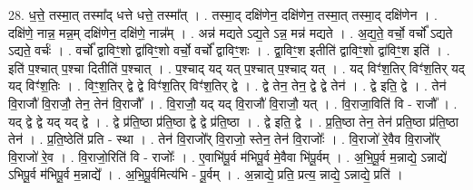 \documentclass[17pt]{extarticle}
\begin{document}
28. ध॒त्ते॒ तस्मा॒त् तस्मा᳚द् धत्ते धत्ते॒ तस्मा᳚त् । . तस्मा॒द् दक्षि॑णेन॒ दक्षि॑णेन॒ तस्मा॒त् तस्मा॒द् दक्षि॑णेन । . दक्षि॑णे॒ नान्न॒ मन्न॒म् दक्षि॑णेन॒ दक्षि॑णे॒ नान्न᳚म् । . अन्न॑ मद्यते ऽद्य॒ते ऽन्न॒ मन्न॑ मद्यते । . अ॒द्य॒ते॒ वर्चो॒ वर्चो᳚ ऽद्यते ऽद्यते॒ वर्चः॑ । . वर्चो᳚ द्वाविꣳ॒॒शो द्वा॑विꣳ॒॒शो वर्चो॒ वर्चो᳚ द्वाविꣳ॒॒शः । . द्वा॒विꣳ॒॒श इतीति॑ द्वाविꣳ॒॒शो द्वा॑विꣳ॒॒श इति॑ । . इति॑ प॒श्चात् प॒श्चा दितीति॑ प॒श्चात् । . प॒श्चाद् यद् यत् प॒श्चात् प॒श्चाद् यत् । . यद् विꣳ॑श॒तिर् विꣳ॑श॒तिर् यद् यद् विꣳ॑श॒तिः । . विꣳ॒॒श॒तिर् द्वे द्वे विꣳ॑श॒तिर् विꣳ॑श॒तिर् द्वे । . द्वे तेन॒ तेन॒ द्वे द्वे तेन॑ । . द्वे इति॒ द्वे । . तेन॑ वि॒राजौ॑ वि॒राजौ॒ तेन॒ तेन॑ वि॒राजौ᳚ । . वि॒राजौ॒ यद् यद् वि॒राजौ॑ वि॒राजौ॒ यत् । . वि॒राजा॒विति॑ वि - राजौ᳚ । . यद् द्वे द्वे यद् यद् द्वे । . द्वे प्र॑ति॒ष्ठा प्र॑ति॒ष्ठा द्वे द्वे प्र॑ति॒ष्ठा । . द्वे इति॒ द्वे । . प्र॒ति॒ष्ठा तेन॒ तेन॑ प्रति॒ष्ठा प्र॑ति॒ष्ठा तेन॑ । . प्र॒ति॒ष्ठेति॑ प्रति - स्था । . तेन॑ वि॒राजो᳚र् वि॒राजो॒ स्तेन॒ तेन॑ वि॒राजोः᳚ । . वि॒राजो॑ रे॒वैव वि॒राजो᳚र् वि॒राजो॑ रे॒व । . वि॒राजो॒रिति॑ वि - राजोः᳚ । . ए॒वाभि॑पू॒र्व म॑भिपू॒र्व मे॒वैवा भि॑पू॒र्वम् । . अ॒भि॒पू॒र्व म॒न्नाद्ये॒ ऽन्नाद्ये॑ ऽभिपू॒र्व म॑भिपू॒र्व म॒न्नाद्ये᳚ । . अ॒भि॒पू॒र्वमित्य॑भि - पू॒र्वम् । . अ॒न्नाद्ये॒ प्रति॒ प्रत्य॒ न्नाद्ये॒ ऽन्नाद्ये॒ प्रति॑ । \newline
\end{document}
